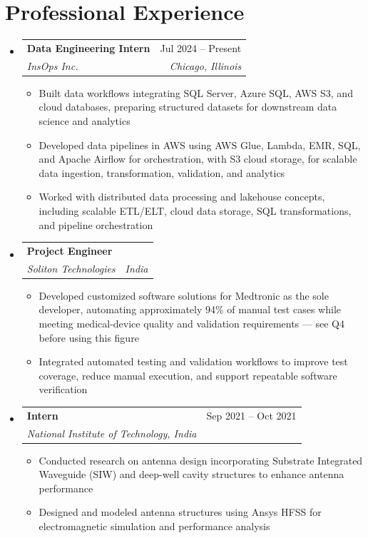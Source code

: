 \documentclass[letterpaper,10pt]{article}
\makeatletter
\newcommand{\resumeSubheading}[4]{
  \vspace{1pt}\item
    \begin{tabular*}{0.985\textwidth}[t]{l@{\extracolsep{\fill}}r}
      \textbf{#1} & #2 \\
      \textit{\small#3} & \textit{\small #4} \\
    \end{tabular*}\vspace{1pt}
}
\newcommand{\resumeItem}[1]{\item\small{#1}}
\newcommand{\resumeSubHeadingListStart}{\begin{itemize}[leftmargin=0.0in, label={}]}
\newcommand{\resumeSubHeadingListEnd}{\end{itemize}\vspace{-2pt}}
\newcommand{\resumeItemListStart}{\begin{itemize}[leftmargin=0.17in]}
\newcommand{\resumeItemListEnd}{\end{itemize}\vspace{2pt}}
\makeatother
\begin{document}
\section{Professional Experience}
  \resumeSubHeadingListStart
    \resumeSubheading
      {Data Engineering Intern}{Jul 2024 -- Present}
      {InsOps Inc.}{Chicago, Illinois}
      \resumeItemListStart
        \resumeItem{Built data workflows integrating SQL Server, Azure SQL, AWS S3, and cloud databases, preparing structured datasets for downstream data science and analytics}
        \resumeItem{Developed data pipelines in AWS using AWS Glue, Lambda, EMR, SQL, and Apache Airflow for orchestration, with S3 cloud storage, for scalable data ingestion, transformation, validation, and analytics}
        \resumeItem{Worked with distributed data processing and lakehouse concepts, including scalable ETL/ELT, cloud data storage, SQL transformations, and pipeline orchestration}
      \resumeItemListEnd
    \resumeSubheading
      {Project Engineer}{}
      {Soliton Technologies}{India}
      \resumeItemListStart
        \resumeItem{Developed customized software solutions for Medtronic as the sole developer, automating approximately 94\% of manual test cases while meeting medical-device quality and validation requirements --- see Q4 before using this figure}
        \resumeItem{Integrated automated testing and validation workflows to improve test coverage, reduce manual execution, and support repeatable software verification}
      \resumeItemListEnd
    \resumeSubheading
      {Intern}{Sep 2021 -- Oct 2021}
      {National Institute of Technology, India}{}
      \resumeItemListStart
        \resumeItem{Conducted research on antenna design incorporating Substrate Integrated Waveguide (SIW) and deep-well cavity structures to enhance antenna performance}
        \resumeItem{Designed and modeled antenna structures using Ansys HFSS for electromagnetic simulation and performance analysis}
      \resumeItemListEnd
  \resumeSubHeadingListEnd
\end{document}
